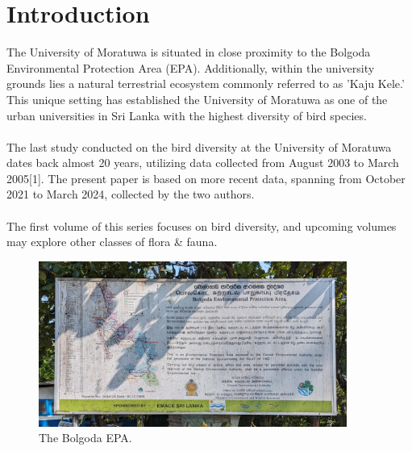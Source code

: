 \chapter{Introduction}
\label{cp:introduction}
The University of Moratuwa is situated in close proximity to the Bolgoda Environmental Protection Area (EPA). Additionally, within the university grounds lies a natural terrestrial ecosystem commonly referred to as 'Kaju Kele.' This unique setting has established the University of Moratuwa as one of the urban universities in Sri Lanka with the highest diversity of bird species.
\\\\
The last study conducted on the bird diversity at the University of Moratuwa dates back almost 20 years, utilizing data collected from August 2003 to March 2005[1]. The present paper is based on more recent data, spanning from October 2021 to March 2024, collected by the two authors.
\\\\
The first volume of this series focuses on bird diversity, and upcoming volumes may explore other classes of flora \& fauna.
\begin{figure}[!htpb]
    \centering
    \includegraphics[width=0.9\textwidth]{Figures/epa.jpg}
    \caption[]{The Bolgoda EPA.}
    \label{fig:figure-01}
\end{figure}

